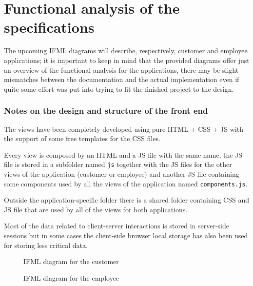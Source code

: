 
\chapter{Functional analysis of the specifications}
\label{chap:functional}

The upcoming IFML diagrams will describe, respectively, customer and employee applications; it is important to keep in mind that the provided diagrams offer just an overview of the functional analysis for the applications, there may be slight mismatches between the documentation and the actual implementation even if quite some effort was put into trying to fit the finished project to the design.

\subsection*{Notes on the design and structure of the front end}

The views have been completely developed using pure HTML + CSS + JS with the support of some free templates for the CSS files. 

Every view is composed by an HTML and a JS file with the same name, the JS file is stored in a subfolder named \texttt{js} together with the JS files for the other views of the application (customer or employee) and another JS file containing some components used by all the views of the application named \texttt{components.js}. 

Outside the application-specific folder there is a shared folder containing CSS and JS file that are used by all of the views for both applications.

Most of the data related to client-server interactions is stored in server-side sessions but in some cases the client-side browser local storage has also been used for storing less critical data.

\begin{landscape}
    \thispagestyle{landscape}
    \begin{figure}[!htbp]
        \vspace*{-2\oddsidemargin}
        \centerline{}
        \caption{IFML diagram for the customer}
        \label{fig:ifml_diagram_customer}
        \vspace{-100pt}
    \end{figure}
\end{landscape}

\begin{landscape}
    \thispagestyle{landscape}
    \begin{figure}[p]
        \vspace*{-2\oddsidemargin}
        \centerline{}
        \caption{IFML diagram for the employee}
        \label{fig:ifml_diagram_employee}
    \end{figure}
\end{landscape}
